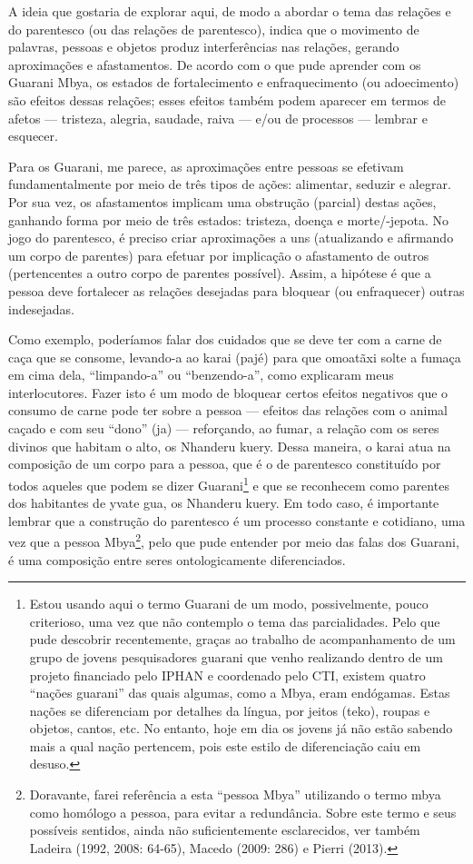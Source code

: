 A ideia que gostaria de explorar aqui, de modo a abordar o tema das
relações e do parentesco (ou das relações de parentesco), indica que o
movimento de palavras, pessoas e objetos produz interferências nas
relações, gerando aproximações e afastamentos. De acordo com o que pude
aprender com os Guarani Mbya, os estados de fortalecimento e
enfraquecimento (ou adoecimento) são efeitos dessas relações; esses
efeitos também podem aparecer em termos de afetos — tristeza, alegria,
saudade, raiva — e/ou de processos — lembrar e esquecer.

Para os Guarani, me parece, as aproximações entre pessoas se efetivam
fundamentalmente por meio de três tipos de ações: alimentar, seduzir e
alegrar. Por sua vez, os afastamentos implicam uma obstrução (parcial)
destas ações, ganhando forma por meio de três estados: tristeza, doença
e morte/-jepota. No jogo do parentesco, é preciso criar aproximações a
uns (atualizando e afirmando um corpo de parentes) para efetuar por
implicação o afastamento de outros (pertencentes a outro corpo de
parentes possível). Assim, a hipótese é que a pessoa deve fortalecer as
relações desejadas para bloquear (ou enfraquecer) outras indesejadas.

Como exemplo, poderíamos falar dos cuidados que se deve ter com a carne
de caça que se consome, levando-a ao karai (pajé) para que omoatãxi
solte a fumaça em cima dela, ``limpando-a'' ou ``benzendo-a'', como
explicaram meus interlocutores. Fazer isto é um modo de bloquear
certos efeitos negativos que o consumo de carne pode ter sobre a pessoa
— efeitos das relações com o animal caçado e com seu ``dono'' (ja) —
reforçando, ao fumar, a relação com os seres divinos que habitam o
alto, os Nhanderu kuery. Dessa maneira, o karai atua na composição de
um corpo para a pessoa, que é o de parentesco constituído por todos
aqueles que podem se dizer Guarani\footnote{Estou usando aqui o termo
Guarani de um modo, possivelmente, pouco criterioso, uma vez que não
contemplo o tema das parcialidades. Pelo que pude descobrir
recentemente, graças ao trabalho de acompanhamento de um grupo de
jovens pesquisadores guarani que venho realizando dentro de um projeto
financiado pelo IPHAN e coordenado pelo CTI, existem quatro ``nações
guarani'' das quais algumas, como a Mbya, eram endógamas. Estas nações
se diferenciam por detalhes da língua, por jeitos (teko), roupas e
objetos, cantos, etc. No entanto, hoje em dia os jovens já não estão
sabendo mais a qual nação pertencem, pois este estilo de diferenciação
caiu em desuso.} e que se reconhecem como parentes dos habitantes de
yvate gua, os Nhanderu kuery. Em todo caso, é importante lembrar que a
construção do parentesco é um processo constante e cotidiano, uma vez
que a pessoa Mbya\footnote{Doravante, farei referência a esta ``pessoa
Mbya'' utilizando o termo mbya como homólogo a pessoa, para evitar a
redundância. Sobre este termo e seus possíveis sentidos, ainda não
suficientemente esclarecidos, ver também Ladeira (1992, 2008: 64-65),
Macedo (2009: 286) e Pierri (2013).  }, pelo que pude entender por meio
das falas dos Guarani, é uma composição entre seres ontologicamente
diferenciados.

